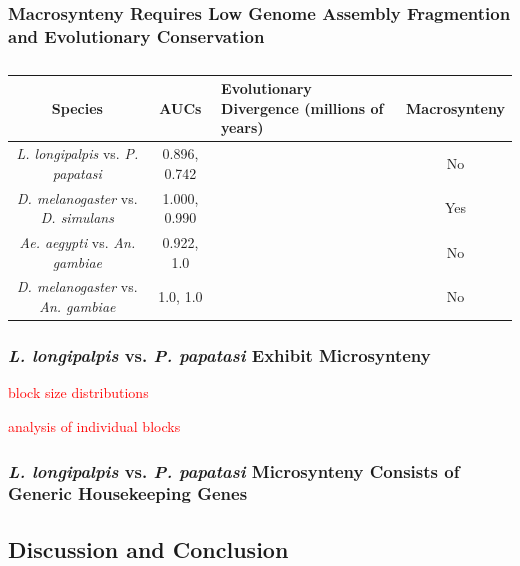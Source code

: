 \subsubsection{Macrosynteny Requires Low Genome Assembly Fragmention and Evolutionary Conservation}

\begin{table}[H]
  \centering
  \begin{tabular}{|c|c|p{2.8cm}|c|} \hline
  Species & AUCs & Evolutionary Divergence (millions of years) & Macrosynteny \\ \hline
  \emph{L. longipalpis} vs. \emph{P. papatasi} & 0.896, 0.742 & & No \\ \hline
  \emph{D. melanogaster} vs. \emph{D. simulans} & 1.000, 0.990 & & Yes \\ \hline
  \emph{Ae. aegypti} vs. \emph{An. gambiae} & 0.922, 1.0 & & No \\ \hline
  \emph{D. melanogaster} vs. \emph{An. gambiae} & 1.0, 1.0 & & No \\ \hline
  \end{tabular}
  \caption{}
  \label{tab:synteny-species}
\end{table}

\subsubsection{\emph{L. longipalpis} vs. \emph{P. papatasi} Exhibit Microsynteny}

\textcolor{red}{block size distributions}

\textcolor{red}{analysis of individual blocks}

\subsubsection{\emph{L. longipalpis} vs. \emph{P. papatasi} Microsynteny Consists of Generic Housekeeping Genes}

\subsection{Discussion and Conclusion}